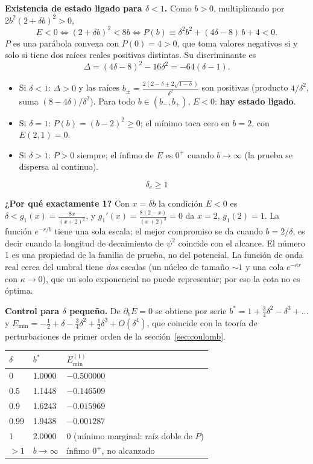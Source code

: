 \documentclass[11pt]{article}
\newcommand{\dc}{\delta_c}
\begin{document}
\textbf{Existencia de estado ligado para $\delta<1$.} Como $b>0$, multiplicando por $2b^2(2+\delta b)^2>0$,
\[
E<0\iff(2+\delta b)^2<8b\iff P(b)\equiv\delta^2b^2+(4\delta-8)\,b+4<0 .
\]
$P$ es una parábola convexa con $P(0)=4>0$, que toma valores negativos si y solo si tiene dos raíces reales positivas distintas. Su discriminante es
\[
\Delta=(4\delta-8)^2-16\delta^2=-64(\delta-1).
\]
\begin{itemize}
\item Si $\delta<1$: $\Delta>0$ y las raíces $b_\pm=\frac{2(2-\delta\pm2\sqrt{1-\delta})}{\delta^2}$ son positivas (producto $4/\delta^2$, suma $(8-4\delta)/\delta^2$). Para todo $b\in(b_-,b_+)$, $E<0$: \textbf{hay estado ligado}.
\item Si $\delta=1$: $P(b)=(b-2)^2\ge0$; el mínimo toca cero en $b=2$, con $E(2,1)=0$.
\item Si $\delta>1$: $P>0$ siempre; el ínfimo de $E$ es $0^+$ cuando $b\to\infty$ (la prueba se dispersa al continuo).
\end{itemize}
\[
\boxed{\dc\ge1}
\]

\textbf{¿Por qué exactamente 1?} Con $x=\delta b$ la condición $E<0$ es $\delta<g_1(x)=\frac{8x}{(x+2)^2}$, y $g_1'(x)=\frac{8(2-x)}{(x+2)^3}=0$ da $x=2$, $g_1(2)=1$. La función $e^{-r/b}$ tiene una sola escala; el mejor compromiso se da cuando $b=2/\delta$, es decir cuando la longitud de decaimiento de $\psi^2$ coincide con el alcance. El número 1 es una propiedad de la familia de prueba, no del potencial. La función de onda real cerca del umbral tiene \emph{dos} escalas (un núcleo de tamaño $\sim1$ y una cola $e^{-\kappa r}$ con $\kappa\to0$), que un solo exponencial no puede representar; por eso la cota no es óptima.

\textbf{Control para $\delta$ pequeño.} De $\partial_bE=0$ se obtiene por serie $b^*=1+\tfrac34\delta^2-\delta^3+\dots$ y $E_{\min}=-\tfrac12+\delta-\tfrac34\delta^2+\tfrac12\delta^3+O(\delta^4)$, que coincide con la teoría de perturbaciones de primer orden de la sección~\ref{sec:coulomb}.

\begin{table}[H]
\centering
\small
\begin{tabular}{@{}lll@{}}
\toprule
$\delta$ & $b^*$ & $E^{(1)}_{\min}$\\
\midrule
0 & 1.0000 & $-0.500000$\\
0.5 & 1.1448 & $-0.146509$\\
0.9 & 1.6243 & $-0.015969$\\
0.99 & 1.9438 & $-0.001287$\\
1 & 2.0000 & 0 (mínimo marginal: raíz doble de $P$)\\
$>1$ & $b\to\infty$ & ínfimo $0^+$, no alcanzado\\
\bottomrule
\end{tabular}
\end{table}
\end{document}
